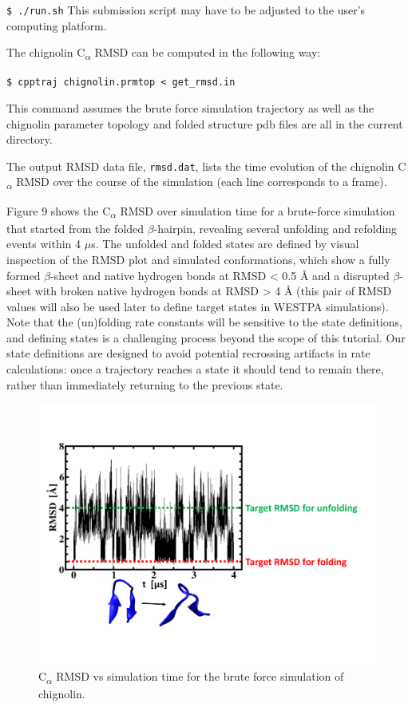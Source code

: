 \documentclass[9pt,tutorial]{livecoms}
\begin{document}
\verb|$ ./run.sh|
This submission script may have to be adjusted to the user’s computing platform.

The chignolin C\textsubscript{$\alpha$} RMSD can be computed in the following way:

\verb|$ cpptraj chignolin.prmtop < get_rmsd.in|

This command assumes the brute force simulation trajectory as well as the chignolin parameter topology and folded structure pdb files are all in the current directory.

The output RMSD data file, \verb|rmsd.dat|, lists the time evolution of the chignolin C\textsubscript{$\alpha$} RMSD over the course of the simulation (each line corresponds to a frame). 

Figure 9 shows the C\textsubscript{$\alpha$} RMSD over simulation time for a brute-force simulation that started from the folded $\beta$-hairpin, revealing several unfolding and refolding events within 4 $\mu$s. 
The unfolded and folded states are defined by visual inspection of the RMSD plot and simulated conformations, which show a fully formed $\beta$-sheet and native hydrogen bonds at RMSD < 0.5 \AA{} and a disrupted $\beta$-sheet with broken native hydrogen bonds at RMSD > 4 \AA{} (this pair of RMSD values will also be used later to define target states in WESTPA simulations).  
Note that the (un)folding rate constants will be sensitive to the state definitions, and defining states is a challenging process beyond the scope of this tutorial. 
Our state definitions are designed to avoid potential recrossing artifacts in rate calculations: once a trajectory reaches a state it should tend to remain there, rather than immediately returning to the previous state.
 

\begin{figure}
\includegraphics[width=\linewidth]{Figure9.png}
\caption{C\textsubscript{$\alpha$} RMSD vs simulation time for the brute force simulation of chignolin.}
\label{fig:view}
\end{figure}
\end{document}
